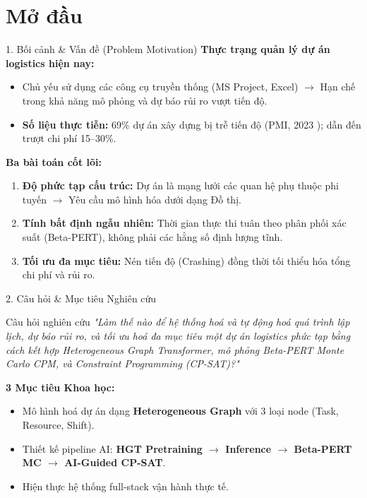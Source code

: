 \section{Mở đầu}

\begin{frame}{1. Bối cảnh \& Vấn đề (Problem Motivation)}
    \textbf{Thực trạng quản lý dự án logistics hiện nay:}
    \begin{itemize}
        \item Chủ yếu sử dụng các công cụ truyền thống (MS Project, Excel) $\rightarrow$ Hạn chế trong khả năng mô phỏng và dự báo rủi ro vượt tiến độ.
        \item \textbf{Số liệu thực tiễn:} 69\% dự án xây dựng bị trễ tiến độ (PMI, 2023 \cite{pmi2023}); dẫn đến trượt chi phí 15–30\%.
    \end{itemize}
    \vspace{0.3cm}
    \textbf{Ba bài toán cốt lõi:}
    \begin{enumerate}
        \item \textbf{Độ phức tạp cấu trúc:} Dự án là mạng lưới các quan hệ phụ thuộc phi tuyến $\rightarrow$ Yêu cầu mô hình hóa dưới dạng Đồ thị.
        \item \textbf{Tính bất định ngẫu nhiên:} Thời gian thực thi tuân theo phân phối xác suất (Beta-PERT), không phải các hằng số định lượng tĩnh.
        \item \textbf{Tối ưu đa mục tiêu:} Nén tiến độ (Crashing) đồng thời tối thiểu hóa tổng chi phí và rủi ro.
    \end{enumerate}
\end{frame}

\begin{frame}{2. Câu hỏi \& Mục tiêu Nghiên cứu}
    \begin{block}{Câu hỏi nghiên cứu}
        \textit{"Làm thế nào để hệ thống hoá và tự động hoá quá trình lập lịch, dự báo rủi ro, và tối ưu hoá đa mục tiêu một dự án logistics phức tạp bằng cách kết hợp Heterogeneous Graph Transformer, mô phỏng Beta-PERT Monte Carlo CPM, và Constraint Programming (CP-SAT)?"}
    \end{block}
    \vspace{0.2cm}
    \textbf{3 Mục tiêu Khoa học:}
    \begin{itemize}
        \item Mô hình hoá dự án dạng \textbf{Heterogeneous Graph} với 3 loại node (Task, Resource, Shift).
        \item Thiết kế pipeline AI: \textbf{HGT Pretraining $\rightarrow$ Inference $\rightarrow$ Beta-PERT MC $\rightarrow$ AI-Guided CP-SAT}.
        \item Hiện thực hệ thống full-stack vận hành thực tế.
    \end{itemize}
\end{frame}

